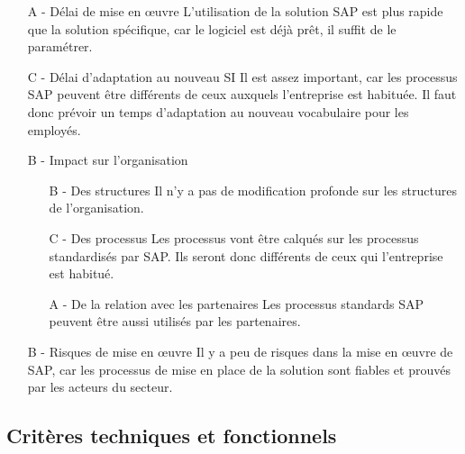\begin{itemize}
\item [A -] Délai de mise en \oe{}uvre\el
	L'utilisation de la solution SAP est plus rapide que la solution
    spécifique, car le logiciel est déjà prêt, il suffit de le paramétrer.

\item [C -] Délai d'adaptation au nouveau SI\el
	Il est assez important, car les processus SAP peuvent être
    différents de ceux auxquels l'entreprise est habituée. Il faut
    donc prévoir un temps d'adaptation au nouveau vocabulaire pour
    les employés.

\item [B -] Impact sur l'organisation
    \begin{itemize}
	\item[B -] Des structures\el
		Il n'y a pas de modification profonde sur les structures
        de l'organisation.
		
	\item[C -] Des processus\el
		Les processus vont être calqués sur les processus standardisés
        par SAP. Ils seront donc différents de ceux qui l'entreprise
        est habitué.

	\item[A -] De la relation avec les partenaires\el
		Les processus standards SAP peuvent être aussi utilisés par
        les partenaires.
    \end{itemize}

\item[B -] Risques de mise en \oe{}uvre\el
	Il y a peu de risques dans la mise en \oe{}uvre de SAP, car les processus
    de mise en place de la solution sont fiables et prouvés par les acteurs
    du secteur. 
\end{itemize}
	

\subsection{Critères techniques et fonctionnels}

